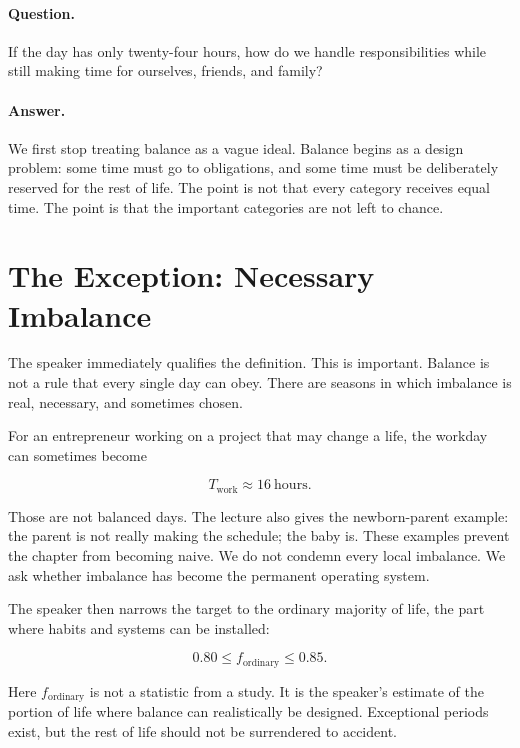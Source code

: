 \paragraph{Question.}
If the day has only twenty-four hours, how do we handle responsibilities while still making time for ourselves, friends, and family?

\paragraph{Answer.}
We first stop treating balance as a vague ideal. Balance begins as a design problem: some time must go to obligations, and some time must be deliberately reserved for the rest of life. The point is not that every category receives equal time. The point is that the important categories are not left to chance.

\section{The Exception: Necessary Imbalance}

The speaker immediately qualifies the definition. This is important. Balance is not a rule that every single day can obey. There are seasons in which imbalance is real, necessary, and sometimes chosen.

For an entrepreneur working on a project that may change a life, the workday can sometimes become

\begin{equation}
T_{\mathrm{work}} \approx 16\ \mathrm{hours}.
\end{equation}

Those are not balanced days. The lecture also gives the newborn-parent example: the parent is not really making the schedule; the baby is. These examples prevent the chapter from becoming naive. We do not condemn every local imbalance. We ask whether imbalance has become the permanent operating system.

The speaker then narrows the target to the ordinary majority of life, the part where habits and systems can be installed:

\begin{equation}
0.80 \leq f_{\mathrm{ordinary}} \leq 0.85.
\end{equation}

Here \(f_{\mathrm{ordinary}}\) is not a statistic from a study. It is the speaker's estimate of the portion of life where balance can realistically be designed. Exceptional periods exist, but the rest of life should not be surrendered to accident.

